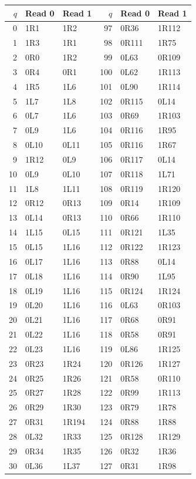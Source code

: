 {\small\ttfamily
\begin{longtable}{@{}rll@{\qquad}rll@{}}
\toprule $q$ & Read 0 & Read 1 & $q$ & Read 0 & Read 1\\\midrule\endhead
0 & 1R1 & 1R2 & 97 & 0R36 & 1R112\\
1 & 1R3 & 1R1 & 98 & 0R111 & 1R75\\
2 & 0R0 & 1R2 & 99 & 0L63 & 0R109\\
3 & 0R4 & 0R1 & 100 & 0L62 & 1R113\\
4 & 1R5 & 1L6 & 101 & 0L90 & 1R114\\
5 & 1L7 & 1L8 & 102 & 0R115 & 0L14\\
6 & 0L7 & 1L6 & 103 & 0R69 & 1R103\\
7 & 0L9 & 1L6 & 104 & 0R116 & 1R95\\
8 & 0L10 & 0L11 & 105 & 0R116 & 1R67\\
9 & 1R12 & 0L9 & 106 & 0R117 & 0L14\\
10 & 0L9 & 0L10 & 107 & 0R118 & 1L71\\
11 & 1L8 & 1L11 & 108 & 0R119 & 1R120\\
12 & 0R12 & 0R13 & 109 & 0R14 & 1R109\\
13 & 0L14 & 0R13 & 110 & 0R66 & 1R110\\
14 & 1L15 & 0L15 & 111 & 0R121 & 1L35\\
15 & 0L15 & 1L16 & 112 & 0R122 & 1R123\\
16 & 0L17 & 1L16 & 113 & 0R88 & 0L14\\
17 & 0L18 & 1L16 & 114 & 0R90 & 1L95\\
18 & 0L19 & 1L16 & 115 & 0R124 & 1R124\\
19 & 0L20 & 1L16 & 116 & 0L63 & 0R103\\
20 & 0L21 & 1L16 & 117 & 0R68 & 0R91\\
21 & 0L22 & 1L16 & 118 & 0R58 & 0R91\\
22 & 0L23 & 1L16 & 119 & 0L86 & 1R125\\
23 & 0R23 & 1R24 & 120 & 0R126 & 1R127\\
24 & 0R25 & 1R26 & 121 & 0R58 & 0R110\\
25 & 0R27 & 1R28 & 122 & 0R99 & 1R113\\
26 & 0R29 & 1R30 & 123 & 0R79 & 1R78\\
27 & 0R31 & 1R194 & 124 & 0R88 & 1R88\\
28 & 0L32 & 1R33 & 125 & 0R128 & 1R129\\
29 & 0R34 & 1R35 & 126 & 0R32 & 1R36\\
30 & 0L36 & 1L37 & 127 & 0R31 & 1R98\\

\end{longtable}}
